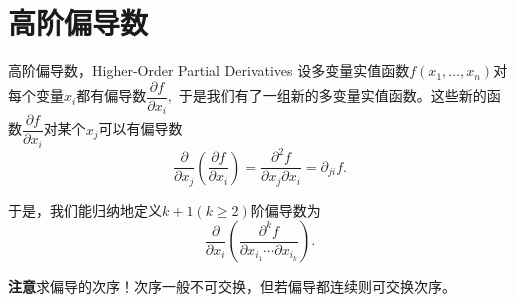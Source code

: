 
\section{高阶偏导数}


\begin{frame}

\begin{block}{高阶偏导数，Higher-Order Partial Derivatives}
设多变量实值函数$f(x_1,\ldots,x_n)$对每个变量$x_i$都有偏导数$\dfrac{\partial f}{\partial x_i},$ 于是我们有了一组新的多变量实值函数。这些新的函数$\dfrac{\partial f}{\partial x_i}$对某个$x_j$可以有偏导数
\[\dfrac{\partial}{\partial x_j}\left( \dfrac{\partial f}{\partial x_i} \right) = \dfrac{\partial^2 f}{\partial x_j \partial x_i} = \partial_{ji}f.\]

\pause

于是，我们能归纳地定义$k+1(k\geqslant2)$阶偏导数为
\[\dfrac{\partial}{\partial x_i}\left( \dfrac{\partial^k f}{\partial x_{i_1} \cdots \partial x_{i_k}} \right).\]
\end{block}

\pause

{\bfseries 注意}求偏导的次序！次序一般不可交换，但若偏导都连续则可交换次序。

\end{frame}















